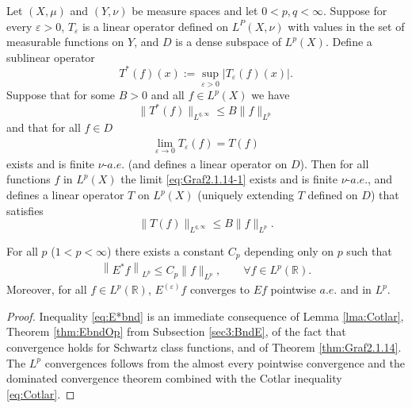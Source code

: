 \documentclass[../dissertation.tex]{subfiles}
\begin{document}
\begin{thm}\label{thm:Graf2.1.14}
	Let $(X, \mu)$ and $(Y, \nu)$ be measure spaces and let $0 < p, q < \infty$.
	Suppose for every $\varepsilon > 0$, $T_\varepsilon$ is a linear operator defined 
	on $L^P(X, \nu)$ with values in the set  of measurable functions on $Y$, and $D$ 
	is a dense subspace of $L^p(X)$. Define a sublinear operator
	\[
		T^*(f)(x) := \sup_{\varepsilon>0} \left| T_\varepsilon(f)(x) \right|.
	\]
	Suppose that for some $B>0$ and all $f \in L^p(X)$ we have
	\[
		\| T^*(f) \|_{L^{q, \infty}} \leq B \|f\|_{L^p}
	\]
	and that for all $f \in D$
	\begin{align}\label{eq:Graf2.1.14-1}
		\lim_{\varepsilon\to0} T_\varepsilon(f) = T(f)
	\end{align}
	exists and is finite $\nu$-$a.e.$ (and defines a linear operator on $D$).
	Then for all functions $f$ in $L^p(X)$ the limit \eqref{eq:Graf2.1.14-1}
	exists and is finite $\nu$-$a.e.$, and defines a linear operator $T$
	on $L^p(X)$ (uniquely extending $T$ defined on $D$) that satisfies
	\[
		\| T(f) \|_{L^{q, \infty}} \leq B \|f\|_{L^p}.
	\]
\end{thm}

\begin{thm}\label{thm:truncEtoE}
	For all $p$ ($1 < p < \infty$) there exists a constant $C_p$ depending
	only on $p$ such that
	\begin{align} \label{eq:E*bnd}
		\left\| E^* f \right\|_{L^p} \leq C_p \|f\|_{L^p}, 
		\qquad \forall f \in L^p(\mathbb R).
	\end{align}
	Moreover, for all $f \in L^p(\mathbb R)$, $E^{(\varepsilon)} f$ converges to 
	$Ef$ pointwise $a.e.$ and in $L^p$.
\end{thm}
\begin{proof}
	Inequality \eqref{eq:E*bnd} is an immediate consequence of Lemma \ref{lma:Cotlar},
	Theorem \ref{thm:EbndOp} from Subsection \ref{sec3:BndE}, of the fact that 
	convergence holds for Schwartz class 
	functions, and of Theorem \ref{thm:Graf2.1.14}. The $L^p$ convergences follows 
	from the almost every pointwise convergence and the dominated convergence 
	theorem combined with the Cotlar inequality \eqref{eq:Cotlar}.
\end{proof}
\end{document}

